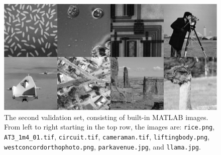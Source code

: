\documentclass[12pt]{article}
\begin{document}
\begin{figure}[ht]
\includegraphics[width=1.0\textwidth]{Figures/ValidationSet2.pdf}
\caption{The second validation set, consisting of built-in MATLAB images. From left to right starting in the top row, the images are: \texttt{rice.png}, \texttt{AT3\_1m4\_01.tif}, \texttt{circuit.tif}, \texttt{cameraman.tif}, \texttt{liftingbody.png}, \texttt{westconcordorthophoto.png}, \texttt{parkavenue.jpg}, and \texttt{llama.jpg}.}
\label{fig:Validation Set 2}
\end{figure}
\end{document}
